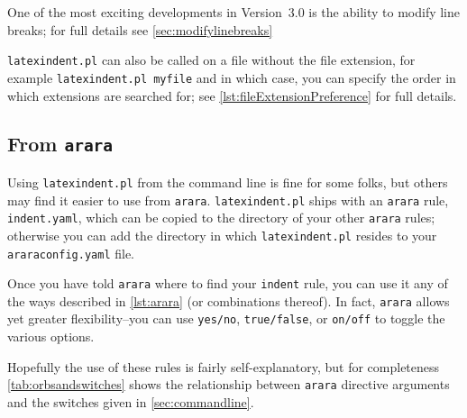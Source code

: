 One of the most exciting developments in Version~3.0 is the ability to modify line breaks; for full details
see \vref{sec:modifylinebreaks}

\texttt{latexindent.pl} can also be called on a file without the file extension, for
example \lstinline[breaklines=true,breakatwhitespace=true,]!latexindent.pl myfile! and in which case, you can specify
the order in which extensions are searched for; see \vref{lst:fileExtensionPreference}
for full details.

\subsection{From \texttt{arara}}\label{sec:arara}
Using \texttt{latexindent.pl} from the command line is fine for some folks, but
others may find it easier to use from \texttt{arara}. \texttt{latexindent.pl}
ships with an \texttt{arara} rule, \texttt{indent.yaml}, which can be copied
to the directory of
your other \texttt{arara} rules; otherwise  you can add the directory in which \texttt{latexindent.pl}
resides to your \texttt{araraconfig.yaml} file.

Once you have told \texttt{arara} where to find your \texttt{indent} rule,
you can use it any of the ways described in \cref{lst:arara} (or combinations thereof).
In fact, \texttt{arara} allows yet greater flexibility--you can use \texttt{yes/no}, \texttt{true/false}, or \texttt{on/off} to toggle the various options.

Hopefully the use of these rules is fairly self-explanatory, but for completeness
\cref{tab:orbsandswitches} shows the relationship between \texttt{arara} directive arguments and the
switches given in \cref{sec:commandline}.

